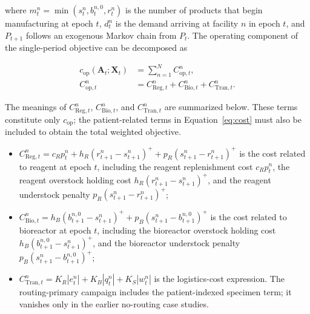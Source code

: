 \documentclass[preprint,review,12pt]{elsarticle}
\begin{document}
where $m_{t}^{n}=\min \left(s_{t}^{n}, b_{t}^{n, 0}, r_{t}^{n}\right)$ is the number of products that begin manufacturing at epoch $t$, $d_{t}^{n}$ is the demand arriving at facility $n$ in epoch $t$, and $P_{t+1}$ follows an exogenous Markov chain from $P_{t}$. The operating component of the single-period objective can be decomposed as

\begin{align*}
c_{\mathrm{op}}\left(\mathbf{A}_{t};\mathbf{X}_{t}\right)
&=\sum_{n=1}^{N} C_{\mathrm{op},t}^{n},\\
C_{\mathrm{op},t}^{n}
&=C_{\text{Reg},t}^{n}+C_{\text{Bio},t}^{n}+C_{\text{Tran},t}^{n}.
\end{align*}

The meanings of $C_{\text{Reg},t}^{n}$, $C_{\text{Bio},t}^{n}$, and
$C_{\text{Tran},t}^{n}$ are summarized below. These terms constitute only
$c_{\mathrm{op}}$; the patient-related terms in Equation~\eqref{eq:cost} must
also be included to obtain the total weighted objective.

\begin{itemize}
  \item $C_{\text{Reg}, t}^{n} = c_{R} p_{t}^{n} + h_{R}\left(r_{t+1}^{n}-s_{t+1}^{n}\right)^{+} + p_{R}\left(s_{t+1}^{n}-r_{t+1}^{n}\right)^{+}$ is the cost related to reagent at epoch $t$, including the reagent replenishment cost $c_{R} p_{t}^{n}$, the reagent overstock holding cost $h_{R}\left(r_{t+1}^{n}-s_{t+1}^{n}\right)^{+}$, and the reagent understock penalty $p_{R}\left(s_{t+1}^{n}-r_{t+1}^{n}\right)^{+}$;
  \item $C_{\text{Bio}, t}^{n} = h_{B}\left(b_{t+1}^{n, 0}-s_{t+1}^{n}\right)^{+} + p_{B}\left(s_{t+1}^{n}-b_{t+1}^{n, 0}\right)^{+}$ is the cost related to bioreactor at epoch $t$, including the bioreactor overstock holding cost $h_{B}\left(b_{t+1}^{n, 0}-s_{t+1}^{n}\right)^{+}$, and the bioreactor understock penalty $p_{B}\left(s_{t+1}^{n}-b_{t+1}^{n, 0}\right)^{+}$;
  \item $C_{\text{Tran}, t}^{n} = K_{R}\left|e_{t}^{n}\right| + K_{B}\left|q_{t}^{n}\right| + K_{S}\left|w_{t}^{n}\right|$ is the logistics-cost expression. The routing-primary campaign includes the patient-indexed specimen term; it vanishes only in the earlier no-routing case studies.
\end{itemize}
\end{document}
